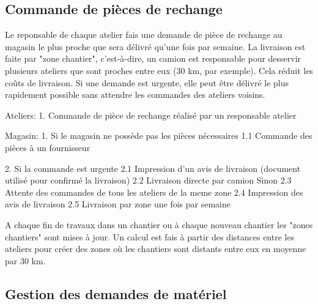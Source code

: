 \documentclass[a4paper]{article}
\begin{document}
\maketitle

\begin{abstract}
Ce document regroupe les annotations effectuées sur les différents MCT
employés au sein de GSTP. Pour inclure ce travail au livrable final,
copier/coller le code \LaTeX suivant.\\
NB : le paragraphe "Commande de pièces de rechange" n'est pas mis en forme.
Il faut se plaindre auprès de \textbf{Victor} :-P.
\end{abstract}

\subsection{Commande de pièces de rechange}

Le reponsable de chaque atelier fais une demande de pièce de rechange au
magasin le plus proche que sera délivré qu'une fois par semaine.  La
livraison est faite par "zone chantier", c'est-à-dire, un camion est
responsable pour desservir plusieurs ateliers que sont proches entre eux
(30 km, par exemple). Cela réduit les coûts de livraison.
Si une demande est urgente, elle peut être délivré le plus rapidement
possible sans attendre les commandes des ateliers voisins.

Ateliers:
1. Commande de pièce de rechange réalisé par un responsable atelier

Magasin:
1. Si le magasin ne possède pas les pièces nécessaires
1.1	Commande des pièces à un fournisseur

2. Si la commande est urgente
2.1	Impression d'un avis de livraison (document utilisé pour confirmé la livraison)
2.2	Livraison directe par camion
   Sinon
2.3	Attente des commandes de tous les ateliers de la meme zone
2.4	Impression des avis de livraison
2.5	Livraison par zone une fois par semaine

A chaque fin de travaux dans un chantier ou à chaque nouveau chantier les
"zones chantiers" sont mises à jour. Un calcul est fais à partir des
distances entre les ateliers pour créer des zones où les chantiers sont
distants entre eux en moyenne par 30 km.


\subsection{Gestion des demandes de matériel}
\end{document}
